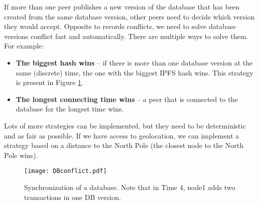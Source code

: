 If more than one peer publishes a new version of the database that has been created from the same database version, other peers need to decide which version they would accept. Opposite to records conflicts, we need to solve database versions conflict fast and automatically. There are multiple ways to solve them. For example: 
\begin{itemize}
    \item \textbf{The biggest hash wins} -- if there is more than one database version at the same (discrete) time, the one with the biggest IPFS hash wins. This strategy is present in Figure \ref{databaseConflict}. 
    \item \textbf{The longest connecting time wins} -- a peer that is connected to the database for the longest time wins.
\end{itemize}
Lots of more strategies can be implemented, but they need to be deterministic and as fair as possible. If we have access to geolocation, we can implement a strategy based on a distance to the North Pole (the closest node to the North Pole wins). \cite{lamport2019time}

\begin{figure}[h]
    \centering
    \texttt{[image: DBconflict.pdf]}
    \caption{Synchronization of a database. Note that in Time 4, node1 adds two transactions in one DB version.}
    \label{databaseConflict}
\end{figure}

